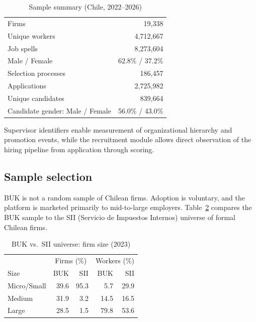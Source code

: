 \documentclass[11pt]{article}
\begin{document}
\begin{table}[h]
\centering
\caption{Sample summary (Chile, 2022--2026)}
\label{tab:summary}
\begin{tabular}{lr}
\hline
Firms                        & 19,338 \\
Unique workers               & 4,712,667 \\
Job spells                   & 8,273,604 \\
Male / Female                & 62.8\% / 37.2\% \\
\hline
Selection processes          & 186,457 \\
Applications                 & 2,725,982 \\
Unique candidates            & 839,664 \\
Candidate gender: Male / Female & 56.0\% / 43.0\% \\
\hline
\end{tabular}
\end{table}

Supervisor identifiers enable measurement of organizational hierarchy and promotion events, while the recruitment module allows direct observation of the hiring pipeline from application through scoring.

\subsection{Sample selection}

BUK is not a random sample of Chilean firms. Adoption is voluntary, and the platform is marketed primarily to mid-to-large employers. Table~\ref{tab:selection} compares the BUK sample to the SII (Servicio de Impuestos Internos) universe of formal Chilean firms.

\begin{table}[h]
\centering
\caption{BUK vs.\ SII universe: firm size (2023)}
\label{tab:selection}
\begin{tabular}{lrrrr}
\hline
 & \multicolumn{2}{c}{Firms (\%)} & \multicolumn{2}{c}{Workers (\%)} \\
Size & BUK & SII & BUK & SII \\
\hline
Micro/Small  & 39.6 & 95.3 & 5.7  & 29.9 \\
Medium       & 31.9 &  3.2 & 14.5 & 16.5 \\
Large        & 28.5 &  1.5 & 79.8 & 53.6 \\
\hline
\end{tabular}
\end{table}
\end{document}
